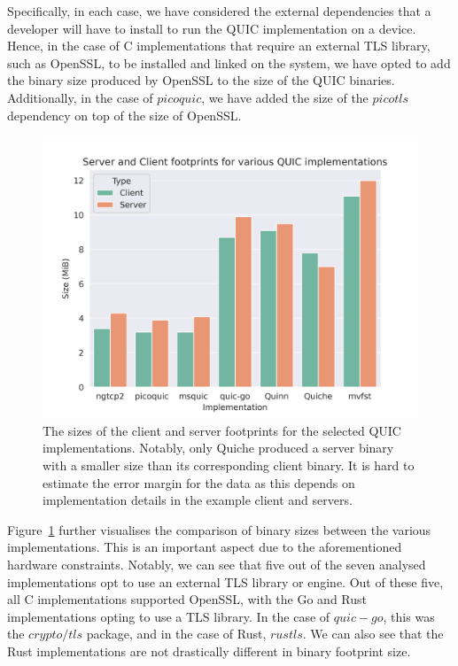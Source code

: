 Specifically, in each case, we have considered the external dependencies that a developer will have to install to run the QUIC implementation on a device.
Hence, in the case of C implementations that require an external TLS library, such as OpenSSL, to be installed and linked on the system, we have opted to add the binary size produced by OpenSSL to the size of the QUIC binaries.
Additionally, in the case of $picoquic$, we have added the size of the $picotls$ dependency on top of the size of OpenSSL.

\begin{figure}[ht]
    \centering
    \includegraphics[width=1\linewidth]{images/quic_impls.png}
    \caption{The sizes of the client and server footprints for the selected QUIC implementations. Notably, only Quiche produced a server binary with a smaller size than its corresponding client binary. It is hard to estimate the error margin for the data as this depends on implementation details in the example client and servers.}
    \label{fig:quic_impls}
\end{figure}

Figure~\ref{fig:quic_impls} further visualises the comparison of binary sizes between the various implementations.
This is an important aspect due to the aforementioned hardware constraints.
Notably, we can see that five out of the seven analysed implementations opt to use an external TLS library or engine.
Out of these five, all C implementations supported OpenSSL, with the Go and Rust implementations opting to use a TLS library.
In the case of $quic-go$, this was the $crypto/tls$ package, and in the case of Rust, $rustls$.
We can also see that the Rust implementations are not drastically different in binary footprint size.


